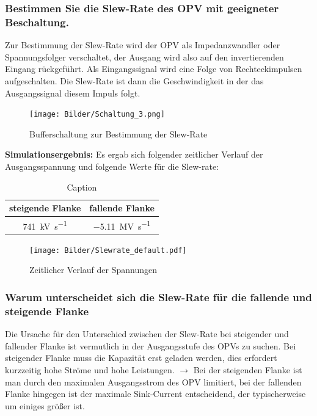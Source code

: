\subsubsection{Bestimmen Sie die Slew-Rate des OPV mit geeigneter Beschaltung.}

Zur Bestimmung der Slew-Rate wird der OPV als Impedanzwandler oder Spannungsfolger verschaltet, der Ausgang wird also auf den invertierenden Eingang rückgeführt. Als Eingangssignal wird eine Folge von Rechteckimpulsen aufgeschalten. Die Slew-Rate ist dann die Geschwindigkeit in der das Ausgangssignal diesem Impuls folgt.

\begin{figure}[H]
    \centering
    \texttt{[image: Bilder/Schaltung\_3.png]}
    \caption{Bufferschaltung zur Bestimmung der Slew-Rate}
    \label{fig:my_label}
\end{figure}

\textbf{Simulationsergebnis:} Es ergab sich folgender zeitlicher Verlauf der Ausgangsspannung und folgende Werte für die Slew-rate:

\begin{table}[H]
    \centering
    \begin{tabular}{|c|c|}
    \hline
         steigende Flanke & fallende Flanke  \\ \hline
         \SI{741}{\kilo \volt \per \second} & \SI{-5.11}{\mega \volt \per \second} \\ \hline
    \end{tabular}
    \caption{Caption}
    \label{tab:my_label}
\end{table}
\begin{figure}[H]
    \centering
    \texttt{[image: Bilder/Slewrate\_default.pdf]}
    \caption{Zeitlicher Verlauf der Spannungen}
\end{figure}

\subsubsection{Warum unterscheidet sich die Slew-Rate für die fallende und steigende Flanke}

Die Ursache für den Unterschied zwischen der Slew-Rate bei steigender und fallender Flanke ist vermutlich in der Ausgangsstufe des OPVs zu suchen. Bei steigender Flanke muss die Kapazität erst geladen werden, dies erfordert kurzzeitig hohe Ströme und hohe Leistungen. $\rightarrow$ Bei der steigenden Flanke ist man durch den maximalen Ausgangsstrom des OPV limitiert, bei der fallenden Flanke hingegen ist der maximale Sink-Current entscheidend, der typischerweise um einiges größer ist.


